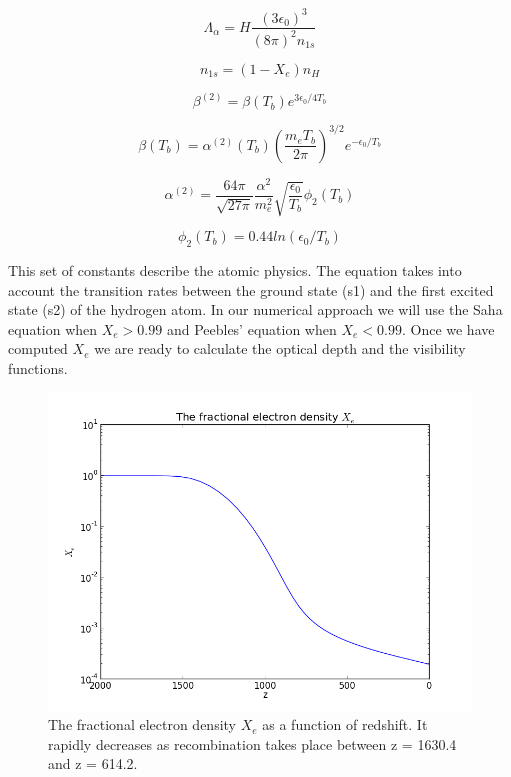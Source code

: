 \documentclass[norsk,a4paper,12pt]{article}
\begin{document}
\begin{equation}
\Lambda_{\alpha} = H\frac{(3\epsilon_0)^3}{(8\pi)^2n_{1s}}
\end{equation}

\begin{equation}
 n_{1s} = (1 - X_e)n_H
\end{equation}

\begin{equation}
 \beta^{(2)} = \beta(T_b)e^{3\epsilon_0/4T_b}
\end{equation}

\begin{equation}
 \beta(T_b) = \alpha^{(2)}(T_b)(\frac{m_eT_b}{2\pi})^{3/2}e^{-\epsilon_0/T_b}
\end{equation}

\begin{equation}
 \alpha^{(2)} = \frac{64\pi}{\sqrt{27\pi}}\frac{\alpha^2}{m_e^2}\sqrt{\frac{\epsilon_0}{T_b}}\phi_2(T_b)
\end{equation}

\begin{equation}
 \phi_2(T_b) = 0.44ln(\epsilon_0/T_b)
\end{equation}

This set of constants describe the atomic physics. The equation takes into account the transition rates between the ground state (s1) and the first excited state (s2) of the hydrogen atom. In our numerical approach we will use the Saha equation when $X_e > 0.99$ and Peebles' equation when $X_e < 0.99$. Once we have computed $X_e$ we are ready to calculate the optical depth and the visibility functions.

\begin{figure}[H] 
\begin{center} 
\includegraphics[scale=0.5]{Xe.png} 
 

\caption{The fractional electron density $X_e$ as a function of redshift. It rapidly decreases as recombination takes place between z = 1630.4 and z = 614.2.} 
\end{center} 
\end{figure}
\end{document}

